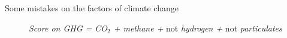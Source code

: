 \begin{framefont}{\small}
\begin{frame}{Some mistakes on the factors of climate change}
\begin{figure}[h!]
\textit{Score on GHG = CO$_\text{2}$ + methane + }not\textit{ hydrogen + }not\textit{ particulates}
\end{figure}
\end{frame}



\end{framefont}
